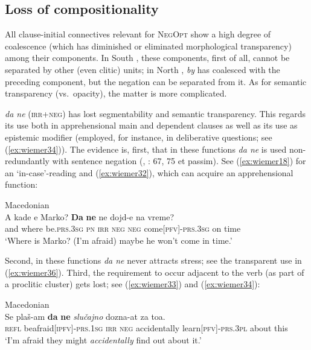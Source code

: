 \documentclass[output=paper,colorlinks,citecolor=brown]{langscibook}
\begin{document}
\subsection{Loss of compositionality}
\label{subsec:lossofcomp}

All clause-initial connectives relevant for \textsc{NegOpt} show a high degree of coalescence (which has diminished or eliminated morphological transparency) among their components. In South , these components, first of all, cannot be separated by other (even clitic) units; in North , \textit{by} has coalesced with the preceding component, but the negation can be separated from it. As for semantic transparency (vs.\ opacity), the matter is more complicated.


 \textit{da ne} (\textsc{irr+neg}) has lost segmentability and semantic transparency. This regards its use both in apprehensional main and dependent clauses as well as its use as epistemic modifier (employed, for instance, in deliberative questions; see (\ref{ex:wiemer34})). The evidence is, first, that in these functions \textit{da ne} is used non-redundantly with sentence negation (\citealt{Bužarovska2017}, \citealt{MitkovskaEtAl2017}: 67, 75 et passim). See (\ref{ex:wiemer18}) for an `in-case'-reading and (\ref{ex:wiemer32}), which can acquire an apprehensional function:


\ea \textnormal{Macedonian} \\
\label{ex:wiemer32} 
\gll A kade e Marko? \textbf{Da} \textbf{ne} ne dojd-e na vreme? \\
and	where be.\textsc{prs.3sg} \textsc{pn} \textsc{irr} \textsc{neg} \textsc{neg} come\textsc{[pfv]-prs.3sg} on time \\
\glt `Where is Marko? (I'm afraid) maybe he won't come in time.'
\z


 Second, in these functions \textit{da ne} never attracts stress; see the transparent use in (\ref{ex:wiemer36}). Third, the requirement to occur adjacent to the verb (as part of a proclitic cluster) gets lost; see (\ref{ex:wiemer33}) and (\ref{ex:wiemer34}):


\ea 
\label{ex:wiemer33} \textnormal{Macedonian} \\
\gll Se plaš-am \textbf{da} \textbf{ne} \textit{slučajno} dozna-at za toa. \\
\textsc{refl} be\textunderscore afraid\textsc{[ipfv]-prs.1sg} \textsc{irr} \textsc{neg} accidentally learn\textsc{[pfv]-prs.3pl} about this \\
\glt `I'm afraid they might \textit{accidentally} find out about it.'
\z
\end{document}
